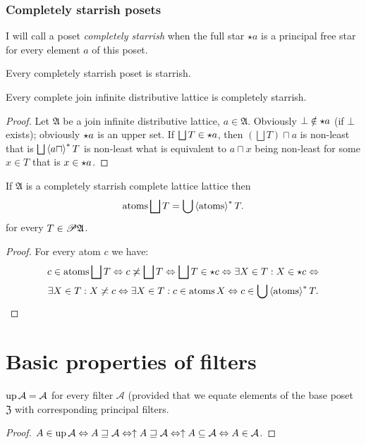 \subsubsection{Completely starrish posets}
\begin{defn}
I will call a poset \emph{completely starrish}
when the full star $\star a$ is a principal free star for every element
$a$ of this poset.\end{defn}
\begin{obvious}
Every completely starrish poset is starrish.\end{obvious}
\begin{prop}
Every complete join infinite distributive lattice is completely starrish.\end{prop}
\begin{proof}
Let $\mathfrak{A}$ be a join infinite distributive lattice, $a\in\mathfrak{A}$.
Obviously $\bot\notin\star a$ (if $\bot$ exists); obviously
$\star a$ is an upper set. If $\bigsqcup T\in\star a$, then
$\left(\bigsqcup T\right)\sqcap a$ is non-least that is $\bigsqcup\left\langle a\sqcap\right\rangle ^{\ast}T$
is non-least what is equivalent to $a\sqcap x$ being non-least for
some $x\in T$ that is $x\in\star a$.\end{proof}
\begin{thm}
If $\mathfrak{A}$ is a completely starrish complete lattice lattice
then 
\[
\operatorname{atoms}\bigsqcup T=\bigcup\left\langle \operatorname{atoms}\right\rangle ^{\ast}T.
\]
for every $T\in\mathscr{P}\mathfrak{A}$.\end{thm}
\begin{proof}
For every atom $c$ we have: 
\begin{multline*}
c\in\operatorname{atoms}\bigsqcup T\Leftrightarrow c\not\asymp\bigsqcup T\Leftrightarrow\bigsqcup T\in\star c\Leftrightarrow\exists X\in T:X\in\star c\Leftrightarrow\\
\exists X\in T:X\not\asymp c\Leftrightarrow\exists X\in T:c\in\operatorname{atoms} X\Leftrightarrow c\in\bigcup\left\langle \operatorname{atoms}\right\rangle ^{\ast}T.
\end{multline*}

\end{proof}

\section{Basic properties of filters}
\begin{prop}
$\operatorname{up}\mathcal{A}=\mathcal{A}$ for every filter $\mathcal{A}$ (provided
that we equate elements of the base poset~$\mathfrak{Z}$ with corresponding
principal filters.\end{prop}
\begin{proof}
$A\in\operatorname{up}\mathcal{A}\Leftrightarrow A\sqsupseteq\mathcal{A}\Leftrightarrow\uparrow A\sqsupseteq\mathcal{A}\Leftrightarrow\uparrow A\subseteq\mathcal{A}\Leftrightarrow A\in\mathcal{A}$.
\end{proof}

